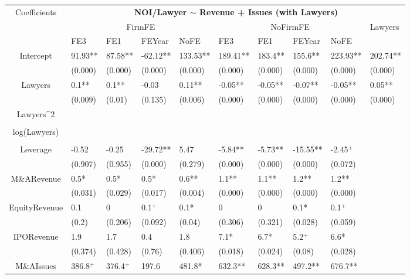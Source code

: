 \documentclass{article}
\begin{document}
\begin{table}[H]
\centering
\begin{tabular}{|clllllllll|}
\hline
\multirow{3}{*}{Coefficients} & \multicolumn{9}{c|}{\textbf{NOI/Lawyer $\sim$ Revenue + Issues (with Lawyers)}} \\
\cline{2-10}
& \multicolumn{4}{c}{FirmFE} & \multicolumn{4}{c}{NoFirmFE} & \multirow{2}{*}{Lawyers} \\
\cline{2-9}
& FE3 & FE1 & FEYear & NoFE & FE3 & FE1 & FEYear & NoFE &  \\
\hline
 
Intercept & 91.93** & 87.58** & -62.12** & 133.53** & 189.41** & 183.4** & 155.6** & 223.93** & 202.74** \\ 
   & (0.000) & (0.000) & (0.000) & (0.000) & (0.000) & (0.000) & (0.000) & (0.000) & (0.000) \\ 
  Lawyers & 0.1** & 0.1** & -0.03 & 0.11** & -0.05** & -0.05** & -0.07** & -0.05** & 0.05** \\ 
   & (0.009) & (0.01) & (0.135) & (0.006) & (0.000) & (0.000) & (0.000) & (0.000) & (0.000) \\ 
  Lawyers^2 &  &  &  &  &  &  &  &  &  \\ 
   &  &  &  &  &  &  &  &  &  \\ 
  log(Lawyers) &  &  &  &  &  &  &  &  &  \\ 
   &  &  &  &  &  &  &  &  &  \\ 
  Leverage & -0.52 & -0.25 & -29.72** & 5.47 & -5.84** & -5.73** & -15.55** & -2.45$^{+}$ &  \\ 
   & (0.907) & (0.955) & (0.000) & (0.279) & (0.000) & (0.000) & (0.000) & (0.072) &  \\ 
  M\&ARevenue & 0.5* & 0.5* & 0.5* & 0.6** & 1.1** & 1.1** & 1.2** & 1.2** &  \\ 
   & (0.031) & (0.029) & (0.017) & (0.004) & (0.000) & (0.000) & (0.000) & (0.000) &  \\ 
  EquityRevenue & 0.1 & 0 & 0.1$^{+}$ & 0.1* & 0 & 0 & 0.1* & 0.1$^{+}$ &  \\ 
   & (0.2) & (0.206) & (0.092) & (0.04) & (0.306) & (0.321) & (0.028) & (0.059) &  \\ 
  IPORevenue & 1.9 & 1.7 & 0.4 & 1.8 & 7.1* & 6.7* & 5.2$^{+}$ & 6.6* &  \\ 
   & (0.374) & (0.428) & (0.76) & (0.406) & (0.018) & (0.024) & (0.08) & (0.028) &  \\ 
  M\&AIssues & 386.8$^{+}$ & 376.4$^{+}$ & 197.6 & 481.8* & 632.3** & 628.3** & 497.2** & 676.7** &  \\ 

\end{tabular}
\end{table}
\end{document}
